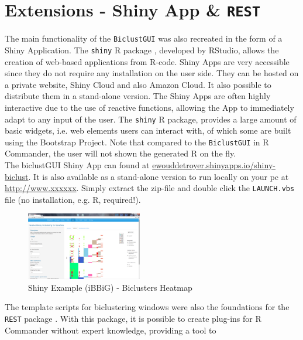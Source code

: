 \documentclass[a4paper]{article}\usepackage[]{graphicx}\usepackage[]{color}
\begin{document}
\section{Extensions - Shiny App \& \texttt{REST}}
The main functionality of the \texttt{BiclustGUI} was also recreated in the form of a Shiny Application. The \texttt{shiny} R package \citep{Chang2015}, developed by RStudio, allows the creation of web-based applications from R-code. Shiny Apps are very accessible since they do not require any installation on the user side. They can be hosted on a private website, Shiny Cloud and also Amazon Cloud. It also possible to distribute them in a stand-alone version. The Shiny Apps are often highly interactive due to the use of reactive functions, allowing the App to immediately adapt to any input of the user. The \texttt{shiny} R package, provides a large amount of basic widgets, i.e. web elements users can interact with, of which some are built using the Bootstrap Project. Note that compared to the \texttt{BiclustGUI} in R Commander, the user will not shown the generated R on the fly.\\
The biclustGUI Shiny App can found at \href{ewouddetroyer.shinyapps.io/shiny-biclust}{ewouddetroyer.shinyapps.io/shiny-biclust}. It is also available as a stand-alone version to run locally on your pc at \href{http://www.xxxxxx}{http://www.xxxxxx}. Simply extract the zip-file and double click the \texttt{LAUNCH.vbs} file (no installation, e.g. R, required!).
\begin{figure}[H]
\centering
\includegraphics[width=0.45\textwidth]{figures/shinyibbig.png}
\caption{Shiny Example (iBBiG) - Biclusters Heatmap}\label{fig:shinyibbig}
\end{figure}
\noindent The template scripts for biclustering windows were also the foundations for the \texttt{REST} package \citep{DeTroyer2015}. 
With this package, it is possible to create plug-ins for R Commander without expert knowledge, providing a tool to 
\end{document}
